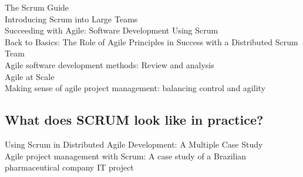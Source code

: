 The Scrum Guide\citep{schwaber2011scrum}\\
Introducing Scrum into Large Teams\citep{maximini2018introducing}\\
Succeeding with Agile: Software Development Using Scrum\citep{cohn2010succeeding}\\
Back to Basics: The Role of Agile Principles in Success with a Distributed Scrum Team\citep{berczuk2007back}\\
Agile software development methods: Review and analysis\citep{abrahamsson2017agile}\\
Agile at Scale\citep{sutherland2018atScale}\\
Making sense of agile project management: balancing control and agility\citep{cobb2011making}\\

\subsection*{What does SCRUM look like in practice?}

Using Scrum in Distributed Agile Development: A Multiple Case Study\citep{paasivaara2009using}\\
Agile project management with Scrum: A case study of a Brazilian pharmaceutical company IT project\citep{azanha2017agile}\\